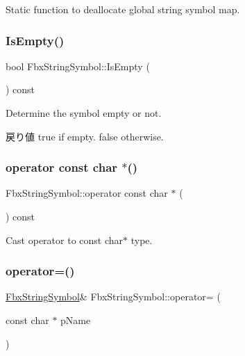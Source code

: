 Static function to deallocate global string symbol map. 

\mbox{\label{class_fbx_string_symbol_ad3c688920d30664d24027e5c5d8e380a}} 
\subsubsection{\texorpdfstring{Is\+Empty()}{IsEmpty()}}
{\footnotesize\ttfamily bool Fbx\+String\+Symbol\+::\+Is\+Empty (\begin{DoxyParamCaption}{ }\end{DoxyParamCaption}) const}

Determine the symbol empty or not. \begin{DoxyReturn}{戻り値}
{\ttfamily true} if empty. {\ttfamily false} otherwise. 
\end{DoxyReturn}
\mbox{\label{class_fbx_string_symbol_ab73c7e02c66db24f6f570730b8f4c0ad}} 
\subsubsection{\texorpdfstring{operator const char $\ast$()}{operator const char *()}}
{\footnotesize\ttfamily Fbx\+String\+Symbol\+::operator const char $\ast$ (\begin{DoxyParamCaption}{ }\end{DoxyParamCaption}) const}



Cast operator to const char$\ast$ type. 

\mbox{\label{class_fbx_string_symbol_a603854f158e237324bce01f8947c55b4}} 
\subsubsection{\texorpdfstring{operator=()}{operator=()}}
{\footnotesize\ttfamily \hyperlink{class_fbx_string_symbol}{Fbx\+String\+Symbol}\& Fbx\+String\+Symbol\+::operator= (\begin{DoxyParamCaption}\item[{const char $\ast$}]{p\+Name }\end{DoxyParamCaption})}

